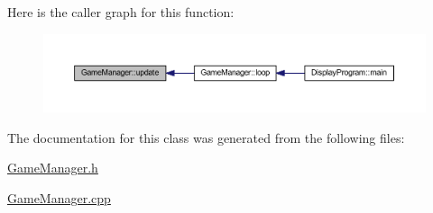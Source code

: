 Here is the caller graph for this function:
\nopagebreak
\begin{figure}[H]
\begin{center}
\leavevmode
\includegraphics[width=400pt]{db/d10/class_game_manager_a7ecc3a14cd9e92f50729b37d1364953f_icgraph}
\end{center}
\end{figure}




The documentation for this class was generated from the following files:\begin{DoxyCompactItemize}
\item 
\hyperlink{_game_manager_8h}{GameManager.h}\item 
\hyperlink{_game_manager_8cpp}{GameManager.cpp}\end{DoxyCompactItemize}
